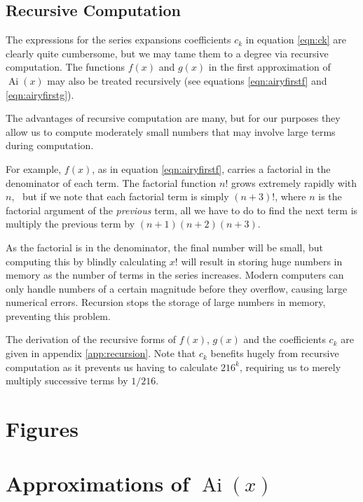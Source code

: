 \documentclass[]{article}
\newcommand{\Ai}[1]{\ensuremath{\operatorname{Ai}({#1})}}
\begin{document}
\subsection{Recursive Computation}\label{ssec:recursion}

The expressions for the series expansions coefficients $c_{k}$ in equation \ref{eqn:ck} are clearly quite cumbersome, but we may tame them to a degree via recursive computation. The functions $f(x)$ and $g(x)$ in the first approximation of $\Ai{x}$ may also be treated recursively (see equations \ref{eqn:airyfirstf} and \ref{eqn:airyfirstg}).

The advantages of recursive computation are many, but for our purposes they allow us to compute moderately small numbers that may involve large terms during computation.

For example, $f(x)$, as in equation \ref{eqn:airyfirstf}, carries a factorial in the denominator of each term. The factorial function $n!$ grows extremely rapidly with $n$,\footnotemark~ but if we note that each factorial term is simply $(n+3)!$, where $n$ is the factorial argument of the \emph{previous} term, all we have to do to find the next term is multiply the previous term by $(n+1)(n+2)(n+3)$.


As the factorial is in the denominator, the final number will be small, but computing this by blindly calculating $x!$ will result in storing huge numbers in memory as the number of terms in the series increases. Modern computers can only handle numbers of a certain magnitude before they overflow, causing large numerical errors. Recursion stops the storage of large numbers in memory, preventing this problem.

The derivation of the recursive forms of $f(x)$, $g(x)$ and the coefficients $c_{k}$ are given in appendix \ref{app:recursion}. Note that $c_{k}$ benefits hugely from recursive computation as it prevents us having to calculate $216^{k}$, requiring us to merely multiply successive terms by $1/216$. 

\section{Figures}\label{sec:figures}



\appendix
\section{Approximations of \Ai{x}}\label{app:approximations}
\end{document}
